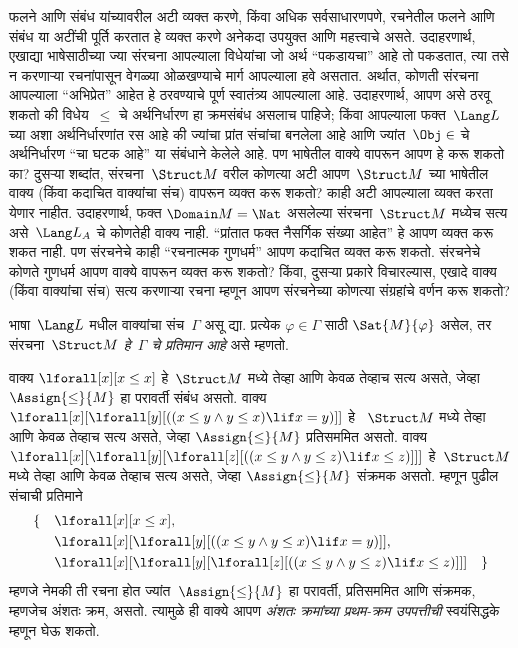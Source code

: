 \begin{explain}
फलने आणि संबंध यांच्यावरील अटी व्यक्त करणे, किंवा अधिक सर्वसाधारणपणे,
रचनेतील फलने आणि संबंध या अटींची पूर्ति करतात हे व्यक्त करणे अनेकदा
उपयुक्त आणि महत्त्वाचे असते. उदाहरणार्थ, एखाद्या भाषेसाठीच्या ज्या
संरचना आपल्याला विधेयांचा जो अर्थ ``पकडायचा'' आहे तो
पकडतात, त्या तसे न करणाऱ्या रचनांपासून वेगळ्या ओळखण्याचे मार्ग आपल्याला
हवे असतात. अर्थात, कोणती संरचना आपल्याला ``अभिप्रेत'' आहेत हे
ठरवण्याचे पूर्ण स्वातंत्र्य आपल्याला आहे. उदाहरणार्थ, आपण असे ठरवू शकतो
की विधेय~$\le$ चे अर्थनिर्धारण हा क्रमसंबंध असलाच पाहिजे; किंवा
आपल्याला फक्त~$\Lang L$ च्या अशा अर्थनिर्धारणांत रस आहे की ज्यांचा प्रांत
संचांचा बनलेला आहे आणि ज्यांत~$\Obj \in$ चे अर्थनिर्धारण ``चा
घटक आहे'' या संबंधाने केलेले आहे. पण भाषेतील वाक्ये वापरून
आपण हे करू शकतो का? दुसऱ्या शब्दांत, संरचना~$\Struct M$ वरील
कोणत्या अटी आपण~$\Struct M$ च्या भाषेतील वाक्य (किंवा कदाचित
वाक्यांचा संच) वापरून व्यक्त करू शकतो? काही अटी आपल्याला व्यक्त करता
येणार नाहीत. उदाहरणार्थ, फक्त $\Domain M = \Nat$ असलेल्या
संरचना~$\Struct M$ मध्येच सत्य असे~$\Lang L_A$ चे कोणतेही वाक्य
नाही. ``प्रांतात फक्त नैसर्गिक संख्या आहेत'' हे आपण व्यक्त करू शकत नाही.
पण संरचनेचे काही ``रचनात्मक गुणधर्म'' आपण कदाचित व्यक्त करू शकतो.
संरचनेचे कोणते गुणधर्म आपण वाक्ये वापरून व्यक्त करू शकतो?
किंवा, दुसऱ्या प्रकारे विचारल्यास, एखादे वाक्य (किंवा
वाक्यांचा संच) सत्य करणाऱ्या रचना म्हणून आपण
संरचनेच्या कोणत्या संग्रहांचे वर्णन करू शकतो?
\end{explain}

\begin{defn}[संचाचे प्रतिमान]
भाषा~$\Lang L$ मधील वाक्यांचा संच~$\Gamma$ असू द्या. प्रत्येक
$\varphi \in \Gamma$ साठी $\Sat{M}{\varphi}$ असेल, तर संरचना~$\Struct M$
\emph{हे~$\Gamma$ चे प्रतिमान आहे} असे म्हणतो.
\end{defn}

\begin{ex}
वाक्य $\lforall[x][x \le x]$ हे~$\Struct M$ मध्ये तेव्हा आणि केवळ तेव्हाच
सत्य असते, जेव्हा $\Assign{\le}{M}$ हा परावर्ती संबंध असतो. वाक्य
$\lforall[x][\lforall[y][((x \le y \land y \le x) \lif x = y)]]$ हे
~$\Struct M$ मध्ये तेव्हा आणि केवळ तेव्हाच सत्य असते, जेव्हा
$\Assign{\le}{M}$ प्रतिसममित असतो. वाक्य
$\lforall[x][\lforall[y][\lforall[z][((x \le y \land y \le z)
      \lif x \le z)]]]$ हे~$\Struct M$ मध्ये तेव्हा आणि केवळ तेव्हाच सत्य
असते, जेव्हा $\Assign{\le}{M}$ संक्रमक असतो. म्हणून पुढील संचाची प्रतिमाने
\begin{align*}
\{\quad &\lforall[x][x \le x], \\
   & \lforall[x][\lforall[y][((x \le y \land y \le
    x) \lif x = y)]], \\
   &\lforall[x][\lforall[y][\lforall[z][((x \le y
      \land y \le z) \lif x \le z)]]] \quad \}
\end{align*}
म्हणजे नेमकी ती रचना होत ज्यांत~$\Assign{\le}{M}$ हा परावर्ती,
प्रतिसममित आणि संक्रमक, म्हणजेच अंशतः क्रम, असतो. त्यामुळे ही वाक्ये
आपण \emph{अंशतः क्रमांच्या प्रथम-क्रम उपपत्तीची} स्वयंसिद्धके म्हणून घेऊ
शकतो.
\end{ex}













